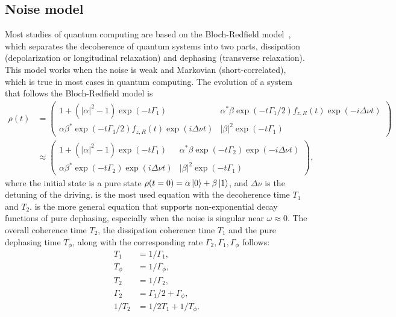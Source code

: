 \documentclass[a4paper,onecolumn,11pt,unpublished]{quantumarticle}
\newcommand{\Tphi}{T_{\phi}}
\newcommand{\Gammaphi}{\Gamma_{\phi}}
\begin{document}
\subsection{Noise model}
Most studies of quantum computing are based on the Bloch-Redfield model~\cite{Wangsness1953The,Redfield1957On,Bloch1957Generalized,Geva1995On}, which separates the decoherence of quantum systems into two parts, dissipation (depolarization or longitudinal relaxation) and dephasing (transverse relaxation). This model works when the noise is weak and Markovian (short-correlated), which is true in most cases in quantum computing.
The evolution of a system that follows the Bloch-Redfield model is~\cite{Ithier2005Manipulation,Ithier2005Decoherence}
\begin{align}
  \rho(t) & = \begin{pmatrix}
                1 + (|\alpha|^2-1)\exp(-t\Gamma_1)                          & \alpha^*\beta\exp(-t\Gamma_1/2)f_{z,R}(t)\exp(-i\Delta\nu t) \\
                \alpha\beta^*\exp(-t\Gamma_1/2)f_{z,R}(t)\exp(i\Delta\nu t) & |\beta|^2\exp(-t\Gamma_1)
              \end{pmatrix}  \label{eq:bloch_redfield_general} \\
          & \approx   \begin{pmatrix}
                        1 + (|\alpha|^2-1)\exp(-t\Gamma_1)               & \alpha^*\beta\exp(-t\Gamma_2)\exp(-i\Delta \nu t) \\
                        \alpha\beta^*\exp(-t\Gamma_2)\exp(i\Delta \nu t) & |\beta|^2\exp(-t\Gamma_1)
                      \end{pmatrix}  , \label{eq:bloch_redfield}
\end{align}
where the initial state is a pure state $\rho(t=0)=\alpha\ket{0}+\beta\ket{1}$, and $\Delta\nu$ is the detuning of the driving.  is the most used equation with the decoherence time $T_1$ and $T_2$.  is the more general equation that supports non-exponential decay functions of pure dephasing, especially when the noise is singular near $\omega\approx 0$. The overall coherence time $T_2$, the dissipation coherence time $T_1$ and the pure dephasing time  $\Tphi$, along with the corresponding rate $\Gamma_2,\Gamma_1,\Gammaphi$ follows:
\begin{align}
  T_1      & = 1/\Gamma_1,  \label{eq:t1_gamma1}                 \\
  \Tphi    & = 1/\Gammaphi, \label{eq:tphi_gammaphi}             \\
  T_2      & = 1/\Gamma_2,  \label{eq:t2_gamma2}                 \\
  \Gamma_2 & = \Gamma_1 / 2 + \Gammaphi, \label{eq:gamma2_1_phi} \\
  1/T_2    & = 1/2T_1 + 1/\Tphi. \label{eq:t2_1_tphi}
\end{align}
\end{document}
